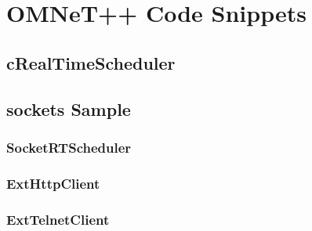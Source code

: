 \chapter{OMNeT++ Code Snippets}
\label{app:omnetpp_code}

\section{cRealTimeScheduler}
\label{app:omnetpp_code_real_time_scheduler}




\section{sockets Sample}
\label{app:omnetpp_code_socket}


\subsection{SocketRTScheduler}
\label{app:omnetpp_code_socket_scheduler}




\subsection{ExtHttpClient}
\label{app:omnetpp_code_socket_http}



\subsection{ExtTelnetClient}
\label{app:omnetpp_code_socket_telnet}



